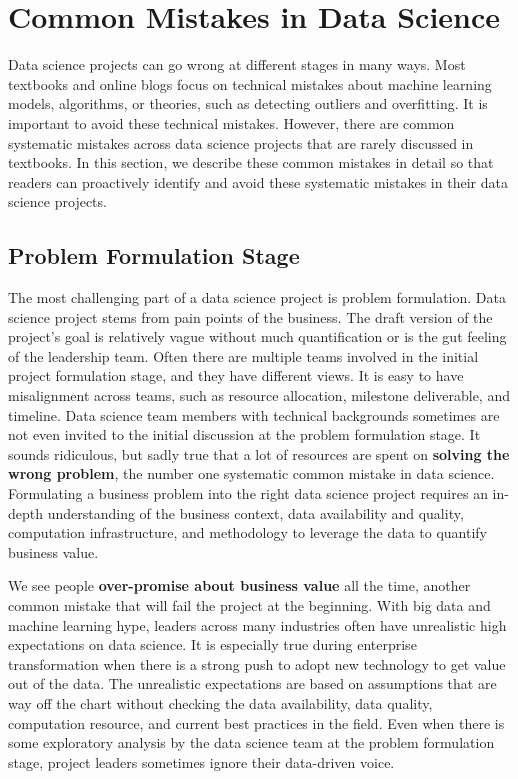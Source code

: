 \documentclass[
  12pt,
]{krantz}
\begin{document}
\hypertarget{common-mistakes-in-data-science}{%
\section{Common Mistakes in Data Science}\label{common-mistakes-in-data-science}}

Data science projects can go wrong at different stages in many ways. Most textbooks and online blogs focus on technical mistakes about machine learning models, algorithms, or theories, such as detecting outliers and overfitting. It is important to avoid these technical mistakes. However, there are common systematic mistakes across data science projects that are rarely discussed in textbooks. In this section, we describe these common mistakes in detail so that readers can proactively identify and avoid these systematic mistakes in their data science projects.

\hypertarget{problem-formulation-stage}{%
\subsection{Problem Formulation Stage}\label{problem-formulation-stage}}

The most challenging part of a data science project is problem formulation. Data science project stems from pain points of the business. The draft version of the project's goal is relatively vague without much quantification or is the gut feeling of the leadership team. Often there are multiple teams involved in the initial project formulation stage, and they have different views. It is easy to have misalignment across teams, such as resource allocation, milestone deliverable, and timeline. Data science team members with technical backgrounds sometimes are not even invited to the initial discussion at the problem formulation stage. It sounds ridiculous, but sadly true that a lot of resources are spent on \textbf{solving the wrong problem}, the number one systematic common mistake in data science. Formulating a business problem into the right data science project requires an in-depth understanding of the business context, data availability and quality, computation infrastructure, and methodology to leverage the data to quantify business value.

We see people \textbf{over-promise about business value} all the time, another common mistake that will fail the project at the beginning. With big data and machine learning hype, leaders across many industries often have unrealistic high expectations on data science. It is especially true during enterprise transformation when there is a strong push to adopt new technology to get value out of the data. The unrealistic expectations are based on assumptions that are way off the chart without checking the data availability, data quality, computation resource, and current best practices in the field. Even when there is some exploratory analysis by the data science team at the problem formulation stage, project leaders sometimes ignore their data-driven voice.
\end{document}
